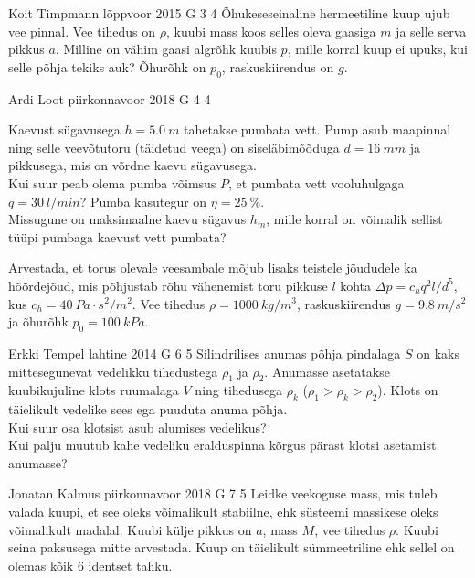 \documentclass[11pt]{article}
\begin{document}
{%
{Koit Timpmann} %
{lõppvoor} %
{2015} %
{G 3} %
{4} %
{
\ifStatement
Õhukeseseinaline hermeetiline kuup ujub vee pinnal. Vee tihedus on $\rho$, kuubi mass koos selles oleva gaasiga $m$ ja selle serva pikkus $a$. Milline on vähim gaasi algrõhk kuubis $p$, mille korral kuup ei upuks, kui selle põhja tekiks auk? Õhurõhk on $p_0$, raskuskiirendus on $g$.
\fi
}

{Ardi Loot} %
{piirkonnavoor} %
{2018} %
{G 4} %
{4} %
{
\ifStatement
Kaevust sügavusega $h=\SI{5.0}{m}$ tahetakse pumbata vett. Pump asub
maapinnal ning selle veevõtutoru (täidetud veega) on siseläbimõõduga
$d=\SI{16}{mm}$ ja pikkusega, mis on võrdne kaevu sügavusega.\\
\osa Kui suur peab olema pumba võimsus $P$, et pumbata vett vooluhulgaga
$q=\SI{30}{l/min}$? Pumba kasutegur on $\eta=\SI{25}{\percent}$.\\
\osa Missugune on maksimaalne kaevu sügavus $h_{m}$, mille korral on
võimalik sellist tüüpi pumbaga kaevust vett pumbata?

Arvestada, et torus olevale veesambale mõjub lisaks teistele jõududele
ka hõõrdejõud, mis põhjustab rõhu vähenemist toru pikkuse $l$ kohta $\Delta p=c_{h}q^{2}l/d^{5},$
kus $c_{h}=\SI{40}{Pa\cdot s^{2}/m^{2}}.$ Vee tihedus $\rho=\SI{1000}{kg/m^{3}}$,
raskuskiirendus $g=\SI{9.8}{m/s^{2}}$ ja õhurõhk $p_{0}=\SI{100}{kPa}.$
\fi
}

{Erkki Tempel} %
{lahtine} %
{2014} %
{G 6} %
{5} %
{
\ifStatement
Silindrilises anumas põhja pindalaga $S$ on kaks mittesegunevat vedelikku tihedustega $\rho_1$ ja $\rho_2$. Anumasse asetatakse kuubikujuline klots ruumalaga $V$ ning tihedusega $\rho_k$ ($\rho_1>\rho_k>\rho_2$). Klots on täielikult vedelike sees ega puuduta anuma põhja.\\
\osa Kui suur osa klotsist asub alumises vedelikus?\\
\osa Kui palju muutub kahe vedeliku eralduspinna kõrgus pärast klotsi asetamist anumasse?
\fi
}

{Jonatan Kalmus} %
{piirkonnavoor} %
{2018} %
{G 7} %
{5} %
{
\ifStatement
Leidke veekoguse mass, mis tuleb valada kuupi, et see oleks võimalikult stabiilne, ehk süsteemi massikese oleks võimalikult madalal. Kuubi külje pikkus on $a$, mass $M$, vee tihedus $\rho$. Kuubi seina paksusega mitte arvestada. Kuup on täielikult sümmeetriline ehk sellel on olemas kõik 6 identset tahku.
\fi
}

}
\end{document}
